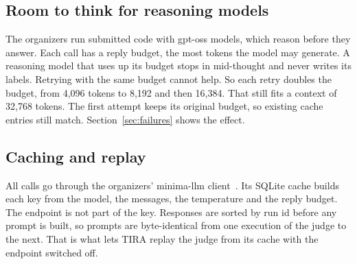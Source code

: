 \subsection{Room to think for reasoning models}
\label{sec:budget}

The organizers run submitted code with gpt-oss models, which reason before they
answer. Each call has a reply budget, the most tokens the model may generate. A
reasoning model that uses up its budget stops in mid-thought and never writes its
labels. Retrying with the same budget cannot help. So each retry doubles the
budget, from 4,096 tokens to 8,192 and then 16,384. That still fits a context of
32,768 tokens. The first attempt keeps its original budget, so existing cache
entries still match. Section~\ref{sec:failures} shows the effect.

\subsection{Caching and replay}

All calls go through the organizers' minima-llm client~\cite{minimallm}. Its SQLite
cache builds each key from the model, the messages, the temperature and the reply
budget. The endpoint is not part of the key. Responses are sorted by run id before
any prompt is built, so prompts are byte-identical from one execution of the judge
to the next. That is what lets TIRA replay the judge from its cache with the
endpoint switched off.
